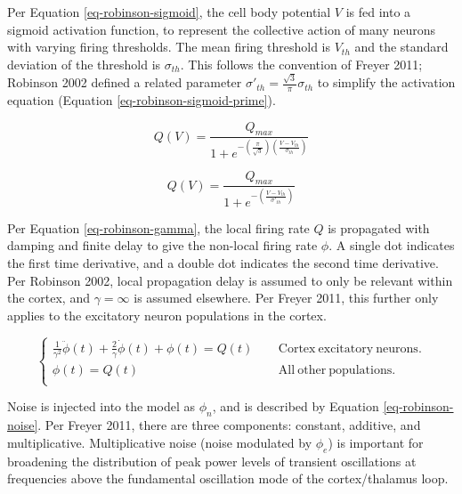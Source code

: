 Per Equation \ref{eq-robinson-sigmoid}, the cell body potential $V$ is fed
into a sigmoid activation function, to represent the collective action of
many neurons with varying firing thresholds. The mean firing threshold is
$V_{th}$ and the standard deviation of the threshold is $\sigma_{th}$.
This follows the convention of Freyer 2011; Robinson 2002 defined a
related parameter $\sigma'_{th} = \frac{\sqrt{3}}{\pi} \sigma_{th}$ to
simplify the activation equation (Equation \ref{eq-robinson-sigmoid-prime}).

\begin{equation}
Q(V) = \frac{Q_{max}}
{1 + e^{- \left ( \frac{\pi}{\sqrt{3}} \right )
\left ( \frac{ V - V_{th}}{\sigma_{th}} \right )}}
\label{eq-robinson-sigmoid}
\end{equation}

\begin{equation}
Q(V) = \frac{Q_{max}}
{1 + e^{- \left ( \frac{ V - V_{th}}{\sigma'_{th}} \right )}}
\label{eq-robinson-sigmoid-prime}
\end{equation}

Per Equation \ref{eq-robinson-gamma}, the local firing rate $Q$ is
propagated with damping and finite delay to give the non-local firing rate
$\phi$. A single dot indicates the first time derivative, and a double dot
indicates the second time derivative. Per Robinson 2002, local propagation
delay is assumed to only be relevant within the cortex, and
$\gamma = \infty$ is assumed elsewhere. Per Freyer 2011, this further only
applies to the excitatory neuron populations in the cortex.

\begin{equation}
\left \{
\begin{array}{rcl}
\frac{1}{\gamma^2} \ddot{\phi}(t) + \frac{2}{\gamma} \dot{\phi}(t) + \phi(t)
= Q(t) & ~~ & \mathrm{Cortex ~ excitatory ~ neurons.} \\
\phi(t) = Q(t) & ~~ & \mathrm{All ~ other ~ populations.} \\
\end{array}
\right .
\label{eq-robinson-gamma}
\end{equation}

Noise is injected into the model as $\phi_n$, and is described by Equation
\ref{eq-robinson-noise}. Per Freyer 2011, there are three components:
constant, additive, and multiplicative. Multiplicative noise (noise
modulated by $\phi_e$) is important for broadening the distribution of
peak power levels of transient oscillations at frequencies above the
fundamental oscillation mode of the cortex/thalamus loop.

